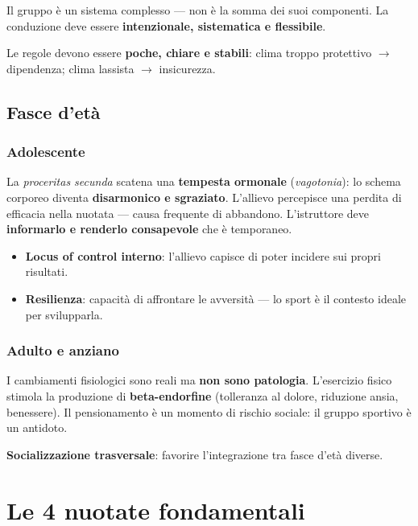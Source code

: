 \documentclass[12pt, a4paper]{article}
\begin{document}
Il gruppo è un sistema complesso --- non è la somma dei suoi componenti. La conduzione deve essere \textbf{intenzionale, sistematica e flessibile}.

Le regole devono essere \textbf{poche, chiare e stabili}: clima troppo protettivo $\rightarrow$ dipendenza; clima lassista $\rightarrow$ insicurezza.

\subsection{Fasce d'età}

\subsubsection{Adolescente}

La \textit{proceritas secunda} scatena una \textbf{tempesta ormonale} (\textit{vagotonia}): lo schema corporeo diventa \textbf{disarmonico e sgraziato}. L'allievo percepisce una perdita di efficacia nella nuotata --- causa frequente di abbandono. L'istruttore deve \textbf{informarlo e renderlo consapevole} che è temporaneo.

\begin{itemize}
  \item \textbf{Locus of control interno}: l'allievo capisce di poter incidere sui propri risultati.
  \item \textbf{Resilienza}: capacità di affrontare le avversità --- lo sport è il contesto ideale per svilupparla.
\end{itemize}

\subsubsection{Adulto e anziano}

I cambiamenti fisiologici sono reali ma \textbf{non sono patologia}. L'esercizio fisico stimola la produzione di \textbf{beta-endorfine} (tolleranza al dolore, riduzione ansia, benessere). Il pensionamento è un momento di rischio sociale: il gruppo sportivo è un antidoto.

\textbf{Socializzazione trasversale}: favorire l'integrazione tra fasce d'età diverse.

\section{Le 4 nuotate fondamentali}
\end{document}
